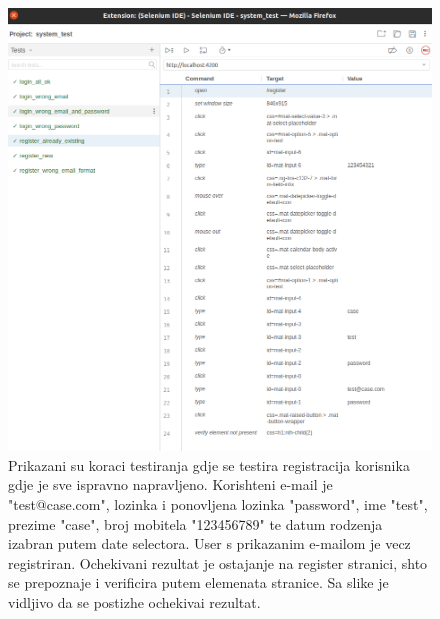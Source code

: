 {            \begin{figure}[H]
                \includegraphics[width=\textwidth]{slike/tests_system/register_already_existing.png} %
                \caption{Prikazani su koraci testiranja gdje se testira registracija korisnika gdje je sve ispravno napravljeno. Korishteni e-mail je "test@case.com", lozinka i ponovljena lozinka "password", ime "test", prezime "case", broj mobitela "123456789" te datum rodzenja izabran putem date selectora. User s prikazanim e-mailom je vecz registriran. Ochekivani rezultat je ostajanje na register stranici, shto se prepoznaje i verificira putem elemenata stranice. Sa slike je vidljivo da se postizhe ochekivai rezultat.}
                \label{fig:struktura} %
            \end{figure}

}
